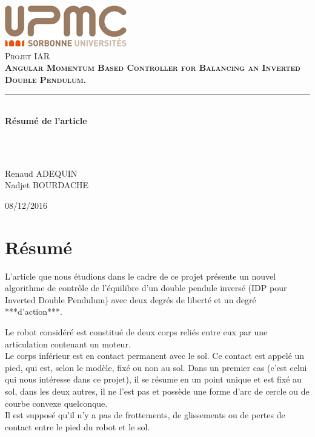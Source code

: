 \documentclass[a4paper,12pt]{report}
\newcommand{\HRule}{\rule{\linewidth}{0.5mm}}
\begin{document}
\begin{titlepage}
  \begin{sffamily}
  \begin{center}
    
    \includegraphics{logo.png}\\[0.5cm]
    
    \textsc{ \huge Projet IAR }\\[4.5cm]


    \textsc{\huge \bfseries Angular Momentum Based Controller for Balancing an Inverted Double Pendulum.}\\[0.5cm]
    \bfseries \HRule \\[0.5cm]
    \huge \bfseries Résumé de l'article

~~\\
~~\\
    \begin{minipage}{0.4\textwidth}
      \begin{center} \large
        Renaud \textsc{ADEQUIN}\\
        Nadjet \textsc{BOURDACHE}\\
      \end{center}
    \end{minipage}

    \vfill

    {\large 08/12/2016}

  \end{center}
  \end{sffamily}
\end{titlepage}

\section*{ Résumé }

L'article que nous étudions dans le cadre de ce projet présente un nouvel algorithme de contrôle de l'équilibre d'un double pendule inversé (IDP pour Inverted Double Pendulum) avec deux degrés de liberté et un degré ***d'action***.

Le robot considéré est constitué de deux corps reliés entre eux par une articulation contenant un moteur.\\
Le corps inférieur est en contact permanent avec le sol. Ce contact est appelé un pied, qui est, selon le modèle, fixé ou non au sol. Dans un premier cas (c'est celui qui nous intéresse dans ce projet), il se résume en un point unique et est fixé au sol, dans les deux autres, il ne l'est pas et possède une forme d'arc de cercle ou de courbe convexe quelconque.\\
Il est supposé qu'il n'y a pas de frottements, de glissements ou de pertes de contact entre le pied du robot et le sol.
\end{document}
